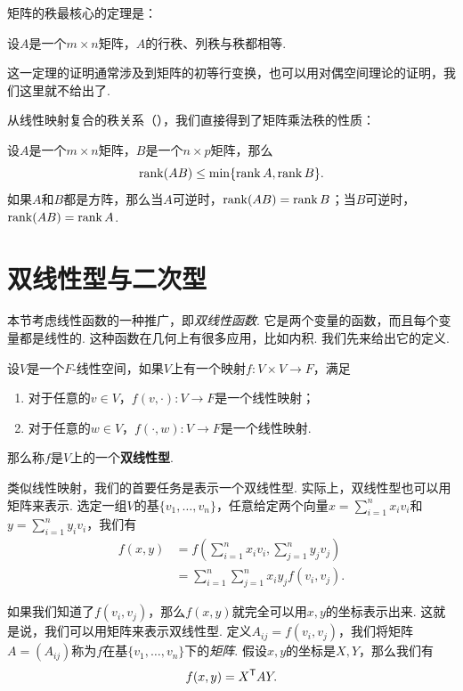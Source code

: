 矩阵的秩最核心的定理是：

\begin{theorem}\label{theorem:rank}
    设$A$是一个$m\times n$矩阵，$A$的行秩、列秩与秩都相等. 
\end{theorem}

这一定理的证明通常涉及到矩阵的初等行变换，也可以用对偶空间理论的证明，我们这里就不给出了. 

从线性映射复合的秩关系（），我们直接得到了矩阵乘法秩的性质：

\begin{proposition}\label{proposition:rank-multiplication}
    设$A$是一个$m\times n$矩阵，$B$是一个$n\times p$矩阵，那么
    \[\operatorname*{rank}(AB)\leq \min\{\operatorname*{rank} A,\operatorname*{rank} B\}.\]
如果$A$和$B$都是方阵，那么当$A$可逆时，$\operatorname*{rank}(AB)=\operatorname*{rank} B$；当$B$可逆时，$\operatorname*{rank}(AB)=\operatorname*{rank} A$.
\end{proposition}

\section{双线性型与二次型}

本节考虑线性函数的一种推广，即\textit{双线性函数}. 它是两个变量的函数，而且每个变量都是线性的. 这种函数在几何上有很多应用，比如内积. 我们先来给出它的定义. 

\begin{definition}[双线性型]\label{definition:bilinear-form}
    设$V$是一个$F$-线性空间，如果$V$上有一个映射$f:V\times V\to F$，满足
    \begin{enumerate}
        \item 对于任意的$v\in V$，$f(v,\cdot):V\to F$是一个线性映射；
        \item 对于任意的$w\in V$，$f(\cdot,w):V\to F$是一个线性映射. 
    \end{enumerate}
    那么称$f$是$V$上的一个\textbf{双线性型}. 
\end{definition}

类似线性映射，我们的首要任务是表示一个双线性型. 实际上，双线性型也可以用矩阵来表示. 选定一组$V$的基$\{v_1,\dots,v_n\}$，任意给定两个向量$x=\sum_{i=1}^n x_iv_i$和$y=\sum_{i=1}^n y_iv_i$，我们有
\begin{align*}
    f(x,y)&=f\left(\sum_{i=1}^n x_iv_i,\sum_{j=1}^n y_jv_j\right)\\
    &=\sum_{i=1}^n\sum_{j=1}^n x_iy_jf(v_i,v_j).
\end{align*}

如果我们知道了$f(v_i,v_j)$，那么$f(x,y)$就完全可以用$x,y$的坐标表示出来. 这就是说，我们可以用矩阵来表示双线性型. 定义$A_{ij}=f(v_i,v_j)$，我们将矩阵$A=(A_{ij})$称为$f$在基$\{v_1,\dots,v_n\}$下的\textit{矩阵}. 假设$x,y$的坐标是$X,Y$，那么我们有
\[
    f(x,y)=X^{\mathsf{T}} AY.
\]

